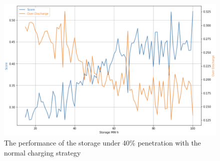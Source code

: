 \documentclass[12pt,a4paper]{report}
\begin{document}
            
            
            \begin{figure}[ht]
                \centerline{\includegraphics[scale=0.9]{simu_score_normal_40}}
                \caption{The performance of the storage under 40\% penetration with the normal charging strategy}
                \label{fig_simu_score_normal_40}
            \end{figure}
            
\end{document}
